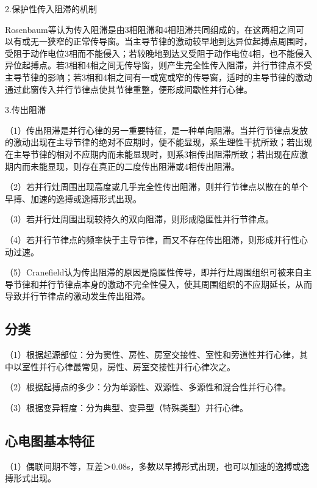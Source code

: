2.保护性传入阻滞的机制

Rosenbaum等认为传入阻滞是由3相阻滞和4相阻滞共同组成的，在这两相之间可以有或无一狭窄的正常传导窗。当主导节律的激动较早地到达异位起搏点周围时，受阻于动作电位3相而不能侵入；若较晚地到达又受阻于动作电位4相，也不能侵入异位起搏点。若3相和4相之间无传导窗，则产生完全性传入阻滞，并行节律点不受主导节律的影响；若3相和4相之间有一或宽或窄的传导窗，适时的主导节律的激动通过此窗传入并行节律点使其节律重整，便形成间歇性并行心律。

3.传出阻滞

（1）传出阻滞是并行心律的另一重要特征，是一种单向阻滞。当并行节律点发放的激动出现在主导节律的绝对不应期时，便不能显现，系生理性干扰所致；若出现在主导节律的相对不应期内而未能显现时，则系3相传出阻滞所致；若出现在应激期内而未能显现，则存在真正的二度传出阻滞或4相传出阻滞。

（2）若并行灶周围出现高度或几乎完全性传出阻滞，则并行节律点以散在的单个早搏、加速的逸搏或逸搏形式出现。

（3）若并行灶周围出现较持久的双向阻滞，则形成隐匿性并行节律点。

（4）若并行节律点的频率快于主导节律，而又不存在传出阻滞，则形成并行性心动过速。

（5）Cranefield认为传出阻滞的原因是隐匿性传导，即并行灶周围组织可被来自主导节律和并行节律点本身的激动不完全性侵入，使其周围组织的不应期延长，从而导致并行节律点的激动发生传出阻滞。

\protect\hypertarget{text00023.htmlux5cux23subid278}{}{}

\subsection{分类}

（1）根据起源部位：分为窦性、房性、房室交接性、室性和旁道性并行心律，其中以室性并行心律最常见，房性、房室交接性并行心律次之。

（2）根据起搏点的多少：分为单源性、双源性、多源性和混合性并行心律。

（3）根据变异程度：分为典型、变异型（特殊类型）并行心律。

\protect\hypertarget{text00023.htmlux5cux23subid279}{}{}

\subsection{心电图基本特征}

（1）偶联间期不等，互差＞0.08s，多数以早搏形式出现，也可以加速的逸搏或逸搏形式出现。

